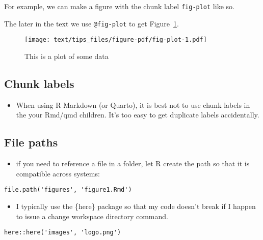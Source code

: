 \documentclass[
  letterpaper,
  oneside]{scrbook}
\providecommand{\tightlist}{%
  \setlength{\itemsep}{0pt}\setlength{\parskip}{0pt}}\usepackage{longtable,booktabs,array}
\begin{document}
For example, we can make a figure with the chunk label \texttt{fig-plot}
like so.

The later in the text we use \texttt{@fig-plot} to get
Figure~\ref{fig-plot}.

\begin{figure}

{\centering \texttt{[image: text/tips\_files/figure-pdf/fig-plot-1.pdf]}

}

\caption{\label{fig-plot}This is a plot of some data}

\end{figure}

\hypertarget{chunk-labels}{%
\subsection{Chunk labels}\label{chunk-labels}}

\begin{itemize}
\tightlist
\item
  When using R Markdown (or Quarto), it is best not to use chunk labels
  in the your Rmd/qmd children. It's too easy to get duplicate labels
  accidentally.
\end{itemize}

\hypertarget{file-paths}{%
\subsection{File paths}\label{file-paths}}

\begin{itemize}
\tightlist
\item
  if you need to reference a file in a folder, let R create the path so
  that it is compatible across systems:
\end{itemize}

\begin{verbatim}
file.path('figures', 'figure1.Rmd')
\end{verbatim}

\begin{itemize}
\tightlist
\item
  I typically use the \{here\} package so that my code doesn't break if
  I happen to issue a change workspace directory command.
\end{itemize}

\begin{verbatim}
here::here('images', 'logo.png')
\end{verbatim}
\end{document}
